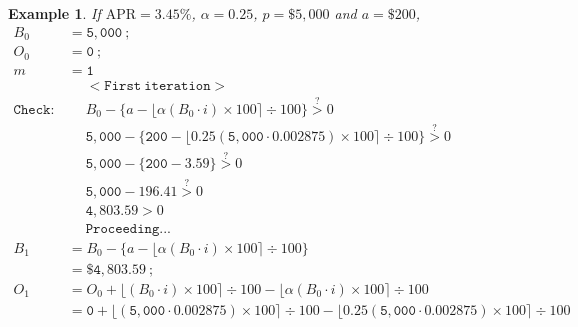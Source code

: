 \documentclass[12pt,letterpaper,oneside]{article}
\newtheorem{example}{Example}[section]
\theoremstyle{remark} %
\begin{document}
	\renewcommand{\rate}{0.002875}
	\renewcommand{\proportion}{0.25}
	\renewcommand{\amount}{200}
	\renewcommand{\balance}{5,000}
	\renewcommand{\interest}{0}
	\renewcommand{\months}{0}
	\renewcommand{\monthsp}{1}
	\renewcommand{\balanceitb}{4,803.59}
	\renewcommand{\interestitb}{10.79}
	\renewcommand{\monthsitb}{1}
	\renewcommand{\monthspitb}{2}
	\renewcommand{\balanceitc}{4,607.04}
	\renewcommand{\interestitc}{21.15}
	\renewcommand{\monthsitc}{2}
	\renewcommand{\monthspitc}{3}
	\renewcommand{\balanceitf}{47.26}
	\renewcommand{\interestitf}{141.77}
	\renewcommand{\monthsitf}{25}%
	\renewcommand{\monthspitf}{26}%
	\renewcommand{\amountfinal}{189.17}
	\begin{example}
	If $\mbox{APR}=3.45\%$, $\alpha=0.25$, $p=\$5,000$ and $a=\$200$,
	\footnotesize
	\begin{align*}
	B_{0}&=\mathtt{\balance}\ ;\\
	O_{0}&=\mathtt{\interest}\ ;\\
	m&=\mathtt{\monthsp}\\[12pt]
	&\quad\;\mathtt{<First\ iteration>}\\
	\mathtt{Check:}&\quad\;B_{\months}-\Big\{a-\big\lfloor{\alpha\left(B_{\months}\cdot i\right)\times 100}\big\rceil\div 100\Big\}\overset{?}{>}0\\[-6pt]
	&\quad\;\mathtt{\balance}-\Big\{\mathtt{\amount}-\big\lfloor{\mathtt{\proportion}\left(\mathtt{\balance}\cdot \mathtt{\rate}\right)\times 100}\big\rceil\div 100\Big\}\overset{?}{>}0\\[-6pt]
	&\quad\;\mathtt{\balance}-\Big\{\mathtt{\amount}-\mathtt{3.59}\Big\}\overset{?}{>}0\\[-6pt]
	&\quad\;\mathtt{\balance}-\mathtt{196.41}\overset{?}{>}0\\
	&\quad\;\mathtt{4,803.59}>0\\
	&\quad\;\mathtt{Proceeding...}\\[12pt]
	B_{\monthsp}&=B_{\months}-\Big\{a-\big\lfloor{\alpha\left(B_{\months}\cdot i\right)\times 100}\big\rceil\div 100\Big\}\\
	&=\mathtt{\$4,803.59}\ ;\\[12pt]
	O_{\monthsp}&=O_{\months}+\big\lfloor{\left(B_{\months}\cdot i\right)\times 100}\big\rceil\div 100-\big\lfloor{\alpha\left(B_{\months}\cdot i\right)\times 100}\big\rceil\div 100\\
	&=\mathtt{\interest}+\big\lfloor{\left(\mathtt{\balance}\cdot \mathtt{\rate}\right)\times 100}\big\rceil\div 100-\big\lfloor{\mathtt{\proportion}\left(\mathtt{\balance}\cdot \mathtt{\rate}\right)\times 100}\big\rceil\div 100\\

\end{align*}
\end{example}
\end{document}
